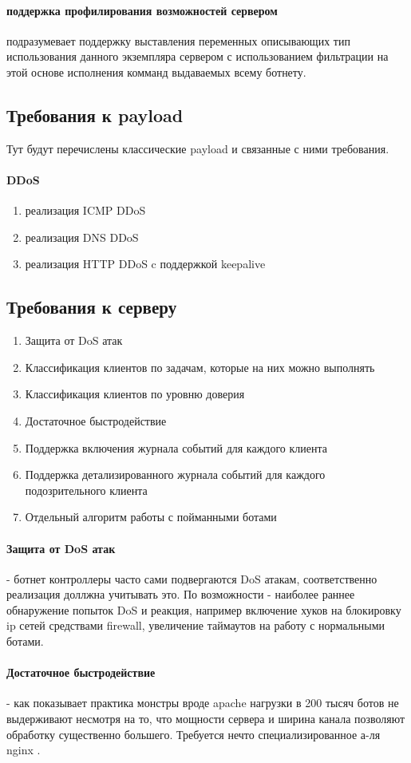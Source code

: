 \paragraph{поддержка профилирования возможностей сервером}
подразумевает поддержку выставления переменных описывающих тип использования данного экземпляра сервером с использованием фильтрации на этой основе исполнения комманд выдаваемых всему ботнету.



\newpage
\subsection{Требования к payload}

Тут будут перечислены классические payload и связанные с ними требования.

\paragraph{DDoS}
\begin{enumerate}
\item{реализация ICMP DDoS}
\item{реализация DNS DDoS}
\item{реализация HTTP DDoS c поддержкой keepalive}
\end{enumerate}


\newpage
\subsection{Требования к серверу}
\begin{enumerate}
\item{Защита от DoS атак}
\item{Классификация клиентов по задачам, которые на них можно выполнять}
\item{Классификация клиентов по уровню доверия}
\item{Достаточное быстродействие}
\item{Поддержка включения журнала событий для каждого клиента}
\item{Поддержка детализированного журнала событий для каждого подозрительного клиента}
\item{Отдельный алгоритм работы с пойманными ботами}
\end{enumerate}

\paragraph{Защита от DoS атак} - ботнет контроллеры часто сами подвергаются DoS атакам, соответственно реализация доллжна учитывать это. По возможности - наиболее раннее обнаружение попыток DoS и реакция, например включение хуков
на блокировку ip сетей средствами firewall, увеличение таймаутов на работу с нормальными ботами.

\paragraph{Достаточное быстродействие} - как показывает практика монстры вроде apache нагрузки в 200 тысяч ботов
не выдерживают несмотря на то, что мощности сервера и ширина канала позволяют обработку существенно большего.
Требуется нечто специализированное а-ля nginx .
